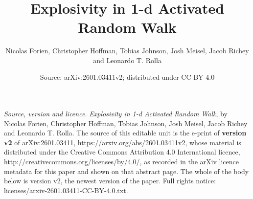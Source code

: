 \documentclass[10pt,a4paper]{amsart}
\begin{document}
\title{Explosivity in 1-d Activated Random Walk}
\author{Nicolas Forien, Christopher Hoffman, Tobias Johnson, Josh Meisel, Jacob Richey and Leonardo T. Rolla}
\date{Source: arXiv:2601.03411v2; distributed under CC BY 4.0}
\maketitle
\noindent\emph{Source, version and licence.} \emph{Explosivity in 1-d Activated Random Walk}, by Nicolas Forien, Christopher Hoffman, Tobias Johnson, Josh Meisel, Jacob Richey and Leonardo T. Rolla. The source of this editable unit is the e-print of \textbf{version v2} of arXiv:2601.03411, https://arxiv.org/abs/2601.03411v2, whose material is distributed under the Creative Commons Attribution 4.0 International licence, http://creativecommons.org/licenses/by/4.0/, as recorded in the arXiv licence metadata for this paper and shown on that abstract page. The whole of the body below is version v2, the newest version of the paper. Full rights notice: licenses/arxiv-2601.03411-CC-BY-4.0.txt.\par\smallskip
\end{document}
